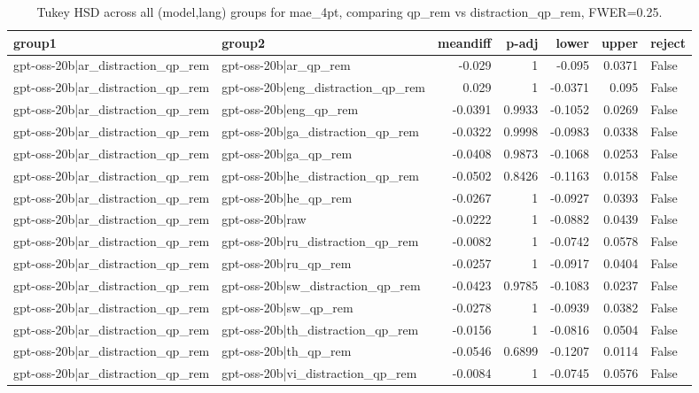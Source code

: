 \begin{table}
\caption{Tukey HSD across all (model,lang) groups for mae_4pt, comparing qp_rem vs distraction_qp_rem, FWER=0.25.}
\label{tab:tukey_all_models_all_langs_mae_4pt_qp_rem_vs_distraction_qp_rem}
\begin{tabular}{l l r r r r l}
\toprule
group1 & group2 & meandiff & p-adj & lower & upper & reject \\
\midrule
gpt-oss-20b|ar_distraction_qp_rem & gpt-oss-20b|ar_qp_rem & -0.029 & 1 & -0.095 & 0.0371 & False \\
gpt-oss-20b|ar_distraction_qp_rem & gpt-oss-20b|eng_distraction_qp_rem & 0.029 & 1 & -0.0371 & 0.095 & False \\
gpt-oss-20b|ar_distraction_qp_rem & gpt-oss-20b|eng_qp_rem & -0.0391 & 0.9933 & -0.1052 & 0.0269 & False \\
gpt-oss-20b|ar_distraction_qp_rem & gpt-oss-20b|ga_distraction_qp_rem & -0.0322 & 0.9998 & -0.0983 & 0.0338 & False \\
gpt-oss-20b|ar_distraction_qp_rem & gpt-oss-20b|ga_qp_rem & -0.0408 & 0.9873 & -0.1068 & 0.0253 & False \\
gpt-oss-20b|ar_distraction_qp_rem & gpt-oss-20b|he_distraction_qp_rem & -0.0502 & 0.8426 & -0.1163 & 0.0158 & False \\
gpt-oss-20b|ar_distraction_qp_rem & gpt-oss-20b|he_qp_rem & -0.0267 & 1 & -0.0927 & 0.0393 & False \\
gpt-oss-20b|ar_distraction_qp_rem & gpt-oss-20b|raw & -0.0222 & 1 & -0.0882 & 0.0439 & False \\
gpt-oss-20b|ar_distraction_qp_rem & gpt-oss-20b|ru_distraction_qp_rem & -0.0082 & 1 & -0.0742 & 0.0578 & False \\
gpt-oss-20b|ar_distraction_qp_rem & gpt-oss-20b|ru_qp_rem & -0.0257 & 1 & -0.0917 & 0.0404 & False \\
gpt-oss-20b|ar_distraction_qp_rem & gpt-oss-20b|sw_distraction_qp_rem & -0.0423 & 0.9785 & -0.1083 & 0.0237 & False \\
gpt-oss-20b|ar_distraction_qp_rem & gpt-oss-20b|sw_qp_rem & -0.0278 & 1 & -0.0939 & 0.0382 & False \\
gpt-oss-20b|ar_distraction_qp_rem & gpt-oss-20b|th_distraction_qp_rem & -0.0156 & 1 & -0.0816 & 0.0504 & False \\
gpt-oss-20b|ar_distraction_qp_rem & gpt-oss-20b|th_qp_rem & -0.0546 & 0.6899 & -0.1207 & 0.0114 & False \\
gpt-oss-20b|ar_distraction_qp_rem & gpt-oss-20b|vi_distraction_qp_rem & -0.0084 & 1 & -0.0745 & 0.0576 & False \\

\end{tabular}
\end{table}
